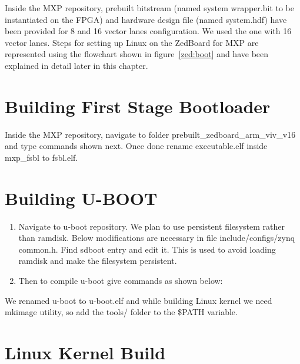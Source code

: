Inside the MXP repository, prebuilt bitstream (named system wrapper.bit to be instantiated on the FPGA) and hardware design file (named system.hdf) have been provided for 8 and 16 vector lanes configuration. We used the one with 16 vector lanes. Steps for setting up Linux on the ZedBoard for MXP are represented using the flowchart shown in figure~\ref{zed:boot} and have been explained in detail later in this chapter.

\section{Building First Stage Bootloader}


Inside the MXP repository, navigate to folder prebuilt\_zedboard\_arm\_viv\_v16 and type commands shown next. Once done rename executable.elf inside mxp\_fsbl to fsbl.elf.




\section{Building U-BOOT}

\begin{enumerate}
	\item Navigate to u-boot repository. We plan to use persistent filesystem rather than ramdisk. Below modifications are necessary in file include/configs/zynq common.h. Find sdboot entry and edit it. This is used to avoid loading ramdisk and make the filesystem persistent.
	
	
	
	\item Then to compile u-boot give commands as shown below:
		
		
\end{enumerate}

We renamed u-boot to u-boot.elf and while building Linux kernel we need mkimage utility, so add the tools/ folder to the \$PATH variable.

\section{Linux Kernel Build}

